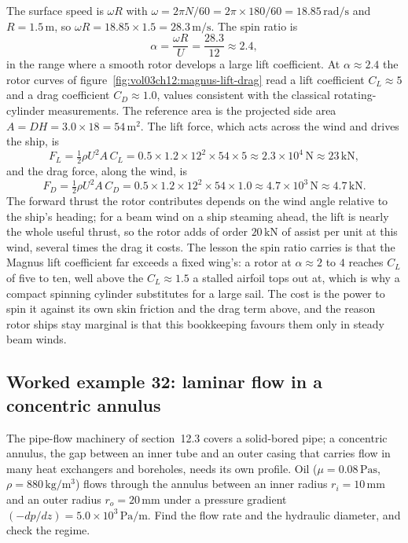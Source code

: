 The surface speed is $\omega R$ with $\omega = 2\pi N/60 = 2\pi\times
180/60 = 18.85\,\si{\radian\per\second}$ and $R = 1.5\,\si{\meter}$, so
$\omega R = 18.85\times1.5 = 28.3\,\si{\meter\per\second}$. The spin
ratio is
\[
\alpha = \frac{\omega R}{U} = \frac{28.3}{12} \approx 2.4,
\]
in the range where a smooth rotor develops a large lift coefficient. At
$\alpha\approx2.4$ the rotor curves of
figure~\ref{fig:vol03ch12:magnus-lift-drag} read a lift coefficient
$C_L\approx5$ and a drag coefficient $C_D\approx1.0$, values consistent
with the classical rotating-cylinder measurements. The reference area is
the projected side area $A = D H = 3.0\times18 = 54\,\si{\meter\squared}$.
The lift force, which acts across the wind and drives the ship, is
\[
F_L = \tfrac12\rho U^2 A\,C_L = 0.5\times1.2\times12^2\times54\times5
\approx 2.3\times10^{4}\,\si{\newton} \approx 23\,\text{kN},
\]
and the drag force, along the wind, is
\[
F_D = \tfrac12\rho U^2 A\,C_D = 0.5\times1.2\times12^2\times54\times1.0
\approx 4.7\times10^{3}\,\si{\newton} \approx 4.7\,\text{kN}.
\]
The forward thrust the rotor contributes depends on the wind angle
relative to the ship's heading; for a beam wind on a ship steaming ahead,
the lift is nearly the whole useful thrust, so the rotor adds of order
$20\,\text{kN}$ of assist per unit at this wind, several times the drag
it costs. The lesson the spin ratio carries is that the Magnus lift
coefficient far exceeds a fixed wing's: a rotor at $\alpha\approx2$ to
$4$ reaches $C_L$ of five to ten, well above the $C_L\approx1.5$ a
stalled airfoil tops out at, which is why a compact spinning cylinder
substitutes for a large sail. The cost is the power to spin it against
its own skin friction and the drag term above, and the reason rotor
ships stay marginal is that this bookkeeping favours them only in steady
beam winds.



\subsection*{Worked example 32: laminar flow in a concentric annulus}

The pipe-flow machinery of section~12.3 covers a solid-bored pipe; a
concentric annulus, the gap between an inner tube and an outer casing
that carries flow in many heat exchangers and boreholes, needs its own
profile. Oil ($\mu = 0.08\,\si{\pascal\second}$, $\rho = 880\,\si{
\kilogram\per\meter\cubed}$) flows through the annulus between an inner
radius $r_i = 10\,\si{\milli\meter}$ and an outer radius $r_o = 20\,\si{
\milli\meter}$ under a pressure gradient $(-dp/dz) = 5.0\times10^{3}\,\si{
\pascal\per\meter}$. Find the flow rate and the hydraulic diameter, and
check the regime.

